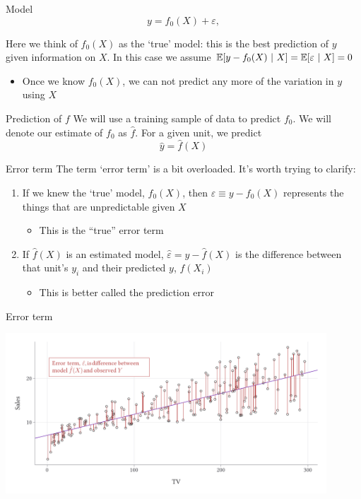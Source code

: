 \documentclass[aspectratio=169,t,11pt,table]{beamer}
\begin{document}
\begin{frame}{Model}
  \vspace*{-\bigskipamount}
  $$
    y = f_0(X) + \varepsilon,
  $$

  Here we think of $f_0(X)$ as the `true' model: this is the best prediction of $y$ given information on $X$. In this case we assume $\expec{y - f_0(X)}{X} = \expec{\varepsilon}{X} = 0$
  \begin{itemize}
    \item Once we know $f_0(X)$, we can not predict any more of the variation in $y$ using $X$
  \end{itemize}
\end{frame}

\begin{frame}{Prediction of $f$}
  We will use a training sample of data to predict $f_0$. We will denote our estimate of $f_0$ as $\hat{f}$. For a given unit, we predict 
  $$
    \hat{y} = \hat{f}(X)
  $$
\end{frame}

\begin{frame}{Error term}
  The term `error term' is a bit overloaded. It's worth trying to clarify:

  \bigskip
  \begin{enumerate}
    \item If we knew the `true' model, $f_0(X)$, then $\varepsilon \equiv y - f_0(X)$ represents the things that are unpredictable given $X$
    \begin{itemize}
      \item This is the ``true'' error term
    \end{itemize}

    \bigskip
    \item If $\hat{f}(X)$ is an estimated model, $\hat{\varepsilon} = y - \hat{f}(X)$ is the difference between that unit's $y_i$ and their predicted $y$, $f(X_i)$
    \begin{itemize}
      \item This is better called the \alert{prediction error}
    \end{itemize}
  \end{enumerate}
\end{frame}

\begin{frame}{Error term}
  \begin{center}
    \includegraphics[width=0.9\textwidth]{figures/sales_tv_error_term.pdf}
  \end{center}
\end{frame}
\end{document}
